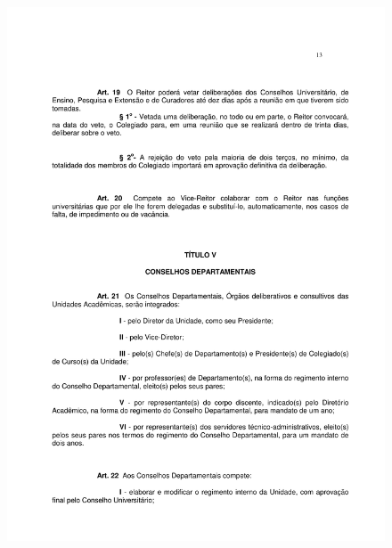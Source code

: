 \begin{figure}[p]
	\centering 
	\includegraphics[scale=0.7]{capitulos/resolucoes/cuni414/cuni414-13.pdf}
\end{figure} \pagebreak

